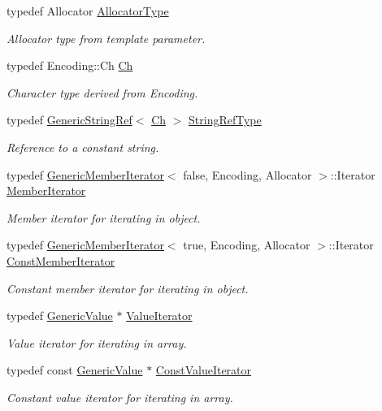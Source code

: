 \begin{DoxyCompactItemize}
typedef Allocator \hyperlink{classGenericValue_a7beb83860c1b8d2a0e2a7da9796b2fa1}{Allocator\+Type}
\begin{DoxyCompactList}\small\item\em Allocator type from template parameter. \end{DoxyCompactList}\item 
typedef Encoding\+::\+Ch \hyperlink{classGenericValue_ade0e0ce64ccd5d852da57a35e720bafb}{Ch}
\begin{DoxyCompactList}\small\item\em Character type derived from Encoding. \end{DoxyCompactList}\item 
typedef \hyperlink{structGenericStringRef}{Generic\+String\+Ref}$<$ \hyperlink{classGenericValue_ade0e0ce64ccd5d852da57a35e720bafb}{Ch} $>$ \hyperlink{classGenericValue_a32e0f30ee278072374c8168b14d3317f}{String\+Ref\+Type}
\begin{DoxyCompactList}\small\item\em Reference to a constant string. \end{DoxyCompactList}\item 
typedef \hyperlink{classGenericMemberIterator}{Generic\+Member\+Iterator}$<$ false, Encoding, Allocator $>$\+::Iterator \hyperlink{classGenericValue_a349b8faae61edc42b4289726820be439}{Member\+Iterator}
\begin{DoxyCompactList}\small\item\em Member iterator for iterating in object. \end{DoxyCompactList}\item 
typedef \hyperlink{classGenericMemberIterator}{Generic\+Member\+Iterator}$<$ true, Encoding, Allocator $>$\+::Iterator \hyperlink{classGenericValue_aac08c3e660a9036d3dcb8b10ff6c61f4}{Const\+Member\+Iterator}
\begin{DoxyCompactList}\small\item\em Constant member iterator for iterating in object. \end{DoxyCompactList}\item 
typedef \hyperlink{classGenericValue}{Generic\+Value} $\ast$ \hyperlink{classGenericValue_aee30721a49688ba0f865f5d581eb6be9}{Value\+Iterator}
\begin{DoxyCompactList}\small\item\em Value iterator for iterating in array. \end{DoxyCompactList}\item 
typedef const \hyperlink{classGenericValue}{Generic\+Value} $\ast$ \hyperlink{classGenericValue_a49010c6d6886f96ff0b0c51bccc7f6ea}{Const\+Value\+Iterator}
\begin{DoxyCompactList}\small\item\em Constant value iterator for iterating in array. \end{DoxyCompactList}\end{DoxyCompactItemize}
